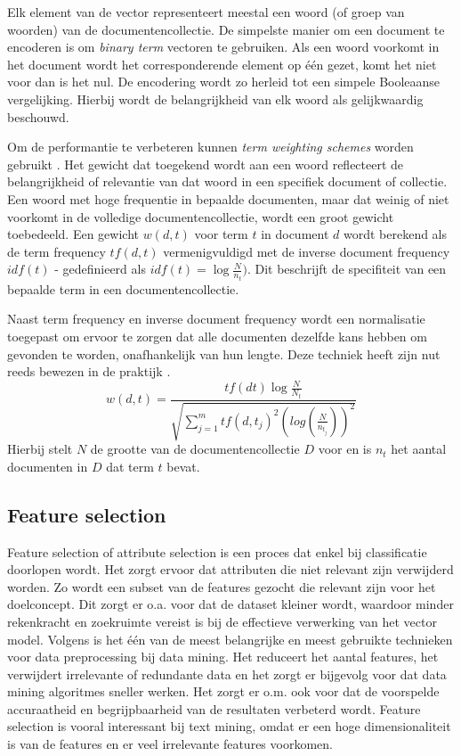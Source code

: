 Elk element van de vector representeert meestal een woord (of groep van woorden) van de documentencollectie. De simpelste manier om een document te encoderen is om \textit{binary term} vectoren te gebruiken. Als een woord voorkomt in het document wordt het corresponderende element op \'e\'en gezet, komt het niet voor dan is het nul. De encodering wordt zo herleid tot een simpele Booleaanse vergelijking. Hierbij wordt de belangrijkheid van elk woord als gelijkwaardig beschouwd. 

Om de performantie te verbeteren kunnen \textit{term weighting schemes} worden gebruikt \cite{Salton1988}. Het gewicht dat toegekend wordt aan een woord reflecteert de belangrijkheid of relevantie van dat woord in een specifiek document of collectie. Een woord met hoge frequentie in bepaalde documenten, maar dat weinig of niet voorkomt in de volledige documentencollectie, wordt een groot gewicht toebedeeld. Een gewicht $w(d,t)$ voor term $t$ in document $d$ wordt berekend als de term frequency $tf(d,t)$ vermenigvuldigd met de inverse document frequency $idf(t)$ - gedefinieerd als $idf(t)=\log{\frac{N}{n_t}})$. Dit beschrijft de specifiteit van een bepaalde term in een documentencollectie. 

Naast term frequency en inverse document frequency wordt een normalisatie toegepast om ervoor te zorgen dat alle documenten dezelfde kans hebben om gevonden te worden, onafhankelijk van hun lengte. Deze techniek heeft zijn nut reeds bewezen in de praktijk . 
\begin{equation}\label{eq:tfidf}
w(d,t) = \frac{tf(dt)\log{\frac{N}{N_t}}}{\sqrt{\sum_{j=1}^{m}tf(d,t_j)^2(log(\frac{N}{n_{t_j}}))^2}}
\end{equation}
Hierbij stelt $N$ de grootte van de documentencollectie $D$ voor en is $n_t$ het aantal documenten in $D$ dat term $t$ bevat.

\subsection{Feature selection}\label{feature-selection}
Feature selection of attribute selection is een proces dat enkel bij classificatie doorlopen wordt. Het zorgt ervoor dat attributen die niet relevant zijn verwijderd worden. Zo wordt een subset van de features gezocht die relevant zijn voor het doelconcept. Dit zorgt er o.a. voor dat de dataset kleiner wordt, waardoor minder rekenkracht en zoekruimte vereist is bij de effectieve verwerking van het vector model. Volgens \cite{Liu2005} is het \'e\'en van de meest belangrijke en meest gebruikte technieken voor data preprocessing bij data mining. Het reduceert het aantal features, het verwijdert irrelevante of redundante data en het zorgt er bijgevolg voor dat data mining algoritmes sneller werken. Het zorgt er o.m. ook voor dat de voorspelde accuraatheid en begrijpbaarheid van de resultaten verbeterd wordt. Feature selection is vooral interessant bij text mining, omdat er een hoge dimensionaliteit is van de features en er veel irrelevante features voorkomen.

